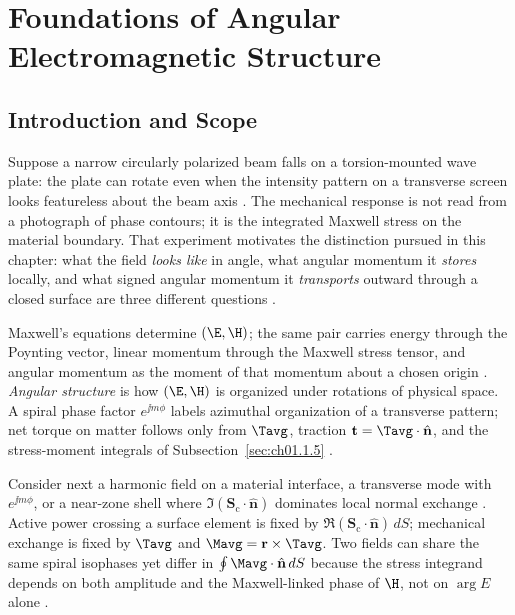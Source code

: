 ﻿\chapter{Foundations of Angular Electromagnetic Structure}
\label{ch:01}
\setcounter{section}{-1}

\section{Introduction and Scope}
\label{sec:ch01.0}

Suppose a narrow circularly polarized beam falls on a torsion-mounted wave plate: the plate can rotate even when the intensity pattern on a transverse screen looks featureless about the beam axis \cite{beth1936}. The mechanical response is not read from a photograph of phase contours; it is the integrated Maxwell stress on the material boundary. That experiment motivates the distinction pursued in this chapter: what the field \emph{looks like} in angle, what angular momentum it \emph{stores} locally, and what signed angular momentum it \emph{transports} outward through a closed surface are three different questions \cite{stratton1941,beth1936}.

Maxwell's equations determine $(\E,\H)$; the same pair carries energy through the Poynting vector, linear momentum through the Maxwell stress tensor, and angular momentum as the moment of that momentum about a chosen origin \cite{maxwell1873,poynting1884}. \emph{Angular structure} is how $(\E,\H)$ is organized under rotations of physical space. A spiral phase factor $e^{\jj m\phi}$ labels azimuthal organization of a transverse pattern; net torque on matter follows only from $\Tavg$, traction $\mathbf{t}=\Tavg\cdot\hat{\mathbf{n}}$, and the stress-moment integrals of Subsection~\ref{sec:ch01.1.5} \cite{allen1992,stratton1941}.

Consider next a harmonic field on a material interface, a transverse mode with $e^{\jj m\phi}$, or a near-zone shell where $\Im(\mathbf{S}_\mathrm{c}\cdot\hat{\mathbf{n}})$ dominates local normal exchange \cite{stratton1941}. Active power crossing a surface element is fixed by $\Re(\mathbf{S}_\mathrm{c}\cdot\hat{\mathbf{n}})\,dS$; mechanical exchange is fixed by $\Tavg$ and $\Mavg=\mathbf{r}\times\Tavg$. Two fields can share the same spiral isophases yet differ in $\oint \Mavg\cdot\hat{\mathbf{n}}\,dS$ because the stress integrand depends on both amplitude and the Maxwell-linked phase of $\H$, not on $\arg E$ alone \cite{stratton1941,allen1992}.

